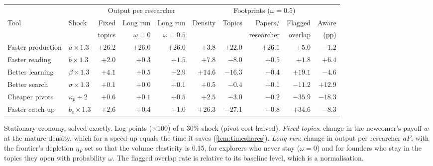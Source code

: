 \small
\setlength{\tabcolsep}{3.6pt}
\begin{tabular}{@{}llrrrrrrrr@{}}
\toprule
 & & \multicolumn{3}{c}{Output per researcher} & \multicolumn{5}{c}{Footprints ($\omega=0.5$)} \\
\cmidrule(lr){3-5}\cmidrule(l){6-10}
Tool & Shock & Fixed & Long run & Long run & Density & Topics & Papers/ & Flagged & Aware \\
 & & topics & $\omega=0$ & $\omega=0.5$ & & & researcher & overlap & (pp) \\
\midrule
Faster production & $a\times1.3$ & $+26.2$ & $+26.0$ & $+26.0$ & $+3.8$ & $+22.0$ & $+26.1$ & $+5.0$ & $-1.2$ \\
Faster reading & $b\times1.3$ & $+2.0$ & $+0.3$ & $+1.5$ & $+7.8$ & $-8.0$ & $+0.5$ & $+1.8$ & $+6.4$ \\
Better learning & $\beta\times1.3$ & $+4.1$ & $+0.5$ & $+2.9$ & $+14.6$ & $-16.3$ & $-0.4$ & $+19.1$ & $-4.6$ \\
Better search & $\sigma\times1.3$ & $+0.1$ & $+0.0$ & $+0.1$ & $+0.5$ & $-0.4$ & $+0.1$ & $-11.2$ & $+12.9$ \\
Cheaper pivots & $\kappa_p\div 2$ & $+0.6$ & $+0.1$ & $+0.5$ & $+2.5$ & $-3.0$ & $-0.2$ & $-35.9$ & $-18.3$ \\
Faster catch-up & $b_c\times1.3$ & $+2.6$ & $+0.4$ & $+1.0$ & $+26.3$ & $-27.1$ & $-0.8$ & $+34.6$ & $-8.3$ \\
\bottomrule
\end{tabular}
\par\smallskip\footnotesize Stationary economy, solved exactly. Log points ($\times100$) of a 30\% shock (pivot cost halved). \emph{Fixed topics}: change in the newcomer's payoff $w$ at the mature density, which for a speed-up equals the time it saves (\cref{lem:timeshares}). \emph{Long run}: change in output per researcher $aF$, with the frontier's depletion $\eta_F$ set so that the volume elasticity is 0.15, for explorers who never stay ($\omega=0$) and for founders who stay in the topics they open with probability $\omega$. The flagged overlap rate is relative to its baseline level, which is a normalisation.
